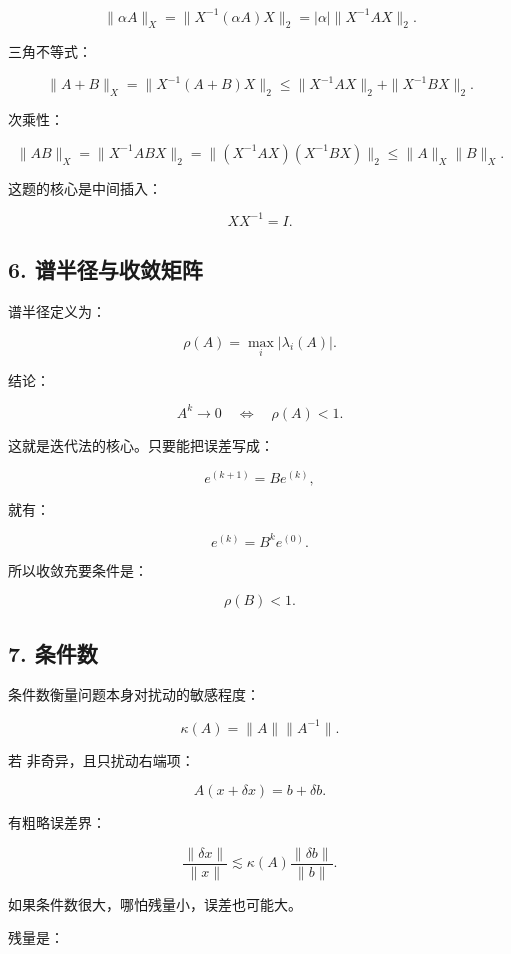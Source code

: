 \documentclass[11pt,a4paper]{ctexart}
\newcommand{\code}[1]{\begingroup\ttfamily\small #1\endgroup}
\begin{document}
\[
\|\alpha A\|_X=\|X^{-1}(\alpha A)X\|_2=|\alpha|\|X^{-1}AX\|_2.
\]

三角不等式：

\[
\|A+B\|_X=\|X^{-1}(A+B)X\|_2
\le \|X^{-1}AX\|_2+\|X^{-1}BX\|_2.
\]

次乘性：

\[
\|AB\|_X=\|X^{-1}ABX\|_2
=\|(X^{-1}AX)(X^{-1}BX)\|_2
\le \|A\|_X\|B\|_X.
\]

这题的核心是中间插入：

\[
XX^{-1}=I.
\]


\subsection*{6. 谱半径与收敛矩阵}


谱半径定义为：

\[
\rho(A)=\max_i |\lambda_i(A)|.
\]

结论：

\[
A^k\to 0\quad \Longleftrightarrow\quad \rho(A)<1.
\]

这就是迭代法的核心。只要能把误差写成：

\[
e^{(k+1)}=Be^{(k)},
\]

就有：

\[
e^{(k)}=B^k e^{(0)}.
\]

所以收敛充要条件是：

\[
\rho(B)<1.
\]


\subsection*{7. 条件数}


条件数衡量问题本身对扰动的敏感程度：

\[
\kappa(A)=\|A\|\|A^{-1}\|.
\]

若 \code{} 非奇异，且只扰动右端项：

\[
A(x+\delta x)=b+\delta b.
\]

有粗略误差界：

\[
\frac{\|\delta x\|}{\|x\|}
\lesssim
\kappa(A)\frac{\|\delta b\|}{\|b\|}.
\]

如果条件数很大，哪怕残量小，误差也可能大。

残量是：
\end{document}
